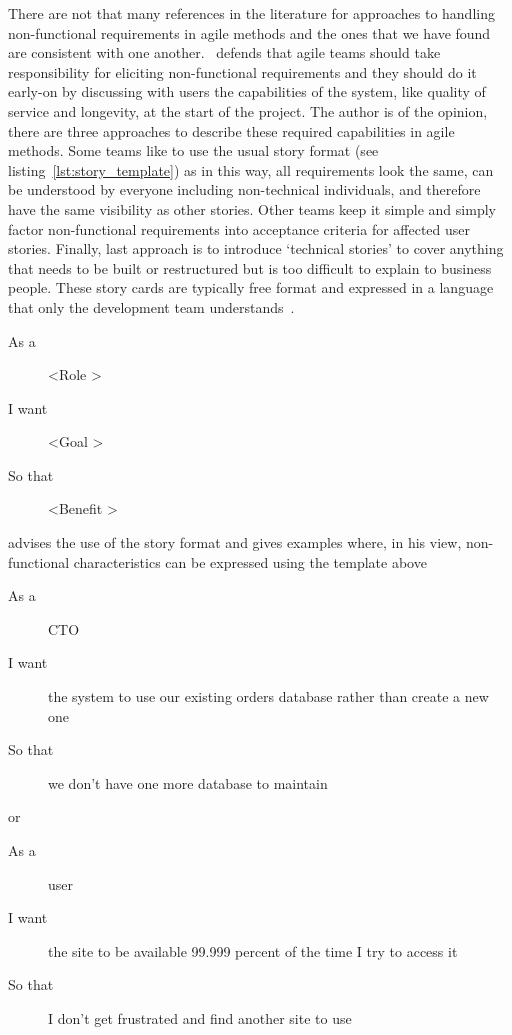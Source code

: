 \documentclass[dissertation,final]{softeng}
\newcommand{\nfrs}{non-functional requirements\xspace}
\begin{document}
There are not that many references in the literature for approaches to handling non-functional requirements in agile methods and the ones that we have found are consistent with one another.~\citet{Davies} defends that agile teams should take responsibility for eliciting non-functional requirements and they should do it early-on by discussing with users the capabilities of the system, like quality of service and longevity, at the start of the project. The author is of the opinion, there are three approaches to describe these required capabilities in agile methods. Some teams like to use the usual story format (see listing~\ref{lst:story_template}) as in this way, all requirements look the same, can be understood by everyone including non-technical individuals, and therefore have the same visibility as other stories. Other teams keep it simple and simply factor \nfrs into acceptance criteria for affected user stories. Finally, last approach is to introduce `technical stories' to cover anything that needs to be built or restructured but is too difficult to explain to business people. These story cards are typically free format and expressed in a language that only the development team understands~\citep{Davies}.

\begin{center}
\begin{description}
\item[As a] \textless Role \textgreater
\item[I want] \textless Goal \textgreater
\item[So that] \textless Benefit \textgreater
\end{description}
\end{center}

\citet{CohnNFRS} advises the use of the story format and gives examples where, in his view, non-functional characteristics can be expressed using the template above

\begin{center}
\begin{description}
\item[As a] CTO 
\item[I want] the system to use our existing orders database rather than create a new one
\item[So that] we don't have one more database to maintain
\end{description}
\end{center}

or

\begin{center}
\begin{description}
\item[As a] user
\item[I want] the site to be available 99.999 percent of the time I try to access it
\item[So that] I don't get frustrated and find another site to use
\end{description}
\end{center}
\end{document}
